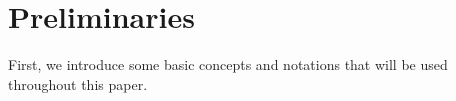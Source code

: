 \section{Preliminaries}
\label{sec:preliminaries}
First, we introduce some basic concepts and notations that will be used throughout this paper.
